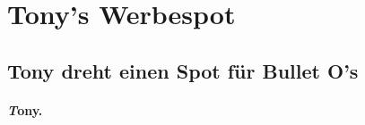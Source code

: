 \documentclass[script_part_two.tex]{subfiles}
\begin{document}
\section{Tony's Werbespot}
\subsection{Tony dreht einen Spot für Bullet O's}
\paragraph{\emph{T}ony.\\}
\end{document}
